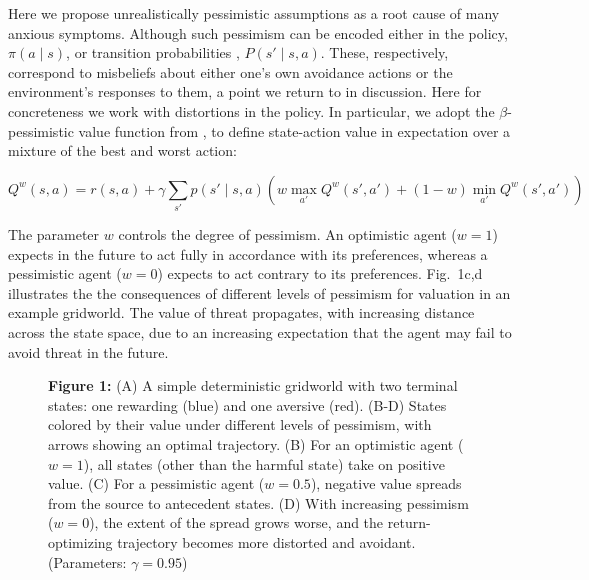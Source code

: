\documentclass[11pt]{article} %
\begin{document}
Here we propose unrealistically pessimistic assumptions as a root cause of many anxious symptoms. Although such pessimism can be encoded either in the policy, $\pi(a \mid s)$, or transition probabilities , $P(s' \mid s,a)$. These, respectively, correspond to misbeliefs about either one's own avoidance actions or the environment's responses to them, a point we return to in discussion. Here for concreteness we work with distortions in the policy. In particular, we adopt the $\beta$-pessimistic value function from \cite{Gaskett2003}, to define state-action value in expectation over a mixture of the best and worst action:

\begin{equation}\label{eq:pessimism}
Q^w(s,a) = r(s,a) + \gamma \sum_{s'} p(s' \mid s,a) \left( w \max_{a'} Q^w(s',a') + (1 - w) \min_{a'} Q^w(s',a') \right)
\end{equation}

The parameter $w$ controls the degree of pessimism. An optimistic agent ($w = 1$) expects in the future to act fully in accordance with its preferences, whereas a pessimistic agent ($w = 0$) expects to act contrary to its preferences. Fig.~1c,d illustrates the the consequences of different levels of pessimism for valuation in an example gridworld. The value of threat propagates, with increasing distance across the state space, due to an increasing expectation that the agent may fail to avoid threat in the future.

\begin{figure}
  \centerline{%
  }
  \par \textbf{Figure 1:} (A) A simple deterministic gridworld with two terminal states: one rewarding (blue) and one aversive (red). (B-D) States colored by their value under different levels of pessimism, with arrows showing an optimal trajectory. (B) For an optimistic agent ($w=1$), all states (other than the harmful state) take on positive value. (C) For a pessimistic agent ($w=0.5$), negative value spreads from the source to antecedent states. (D) With increasing pessimism ($w=0$), the extent of the spread grows worse, and the return-optimizing trajectory becomes more distorted and avoidant. (Parameters: $\gamma = 0.95$)
\end{figure}
\end{document}
